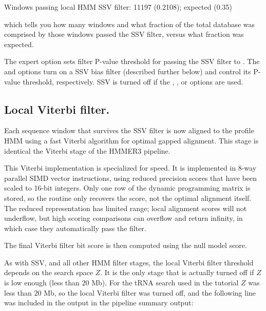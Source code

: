 \begin{sreoutput}
Windows   passing  local HMM SSV           filter:           11197  (0.2108); expected (0.35)
\end{sreoutput}

which tells you how many windows and what fraction of the total
database was comprised by those windows passed the 
SSV filter, versus what fraction was expected.

The  expert option sets filter P-value threshold for
passing the SSV filter to . The  and
 options turn on a SSV bias filter (described further
below) and control its P-value threshold, respectively. SSV is turned
off if the , , or  options
are used.

\subsection{Local Viterbi filter.}
Each sequence window that survives the SSV filter is now aligned to
the profile HMM using a fast Viterbi algorithm for optimal gapped
alignment. This stage is identical the Viterbi stage of the HMMER3
pipeline. 

This Viterbi implementation is specialized for speed.  It is
implemented in 8-way parallel SIMD vector instructions, using reduced
precision scores that have been scaled to 16-bit integers. Only one
row of the dynamic programming matrix is stored, so the routine only
recovers the score, not the optimal alignment itself. The reduced
representation has limited range; local alignment scores will not
underflow, but high scoring comparisons can overflow and return
infinity, in which case they automatically pass the filter.

The final Viterbi filter bit score is then computed using the null
model score. 

As with SSV, and all other HMM filter stages, the local Viterbi filter
threshold depends on the search space $Z$. It is the only stage that
is actually turned off if $Z$ is low enough (less than $20$ Mb). 
For the tRNA search used in the tutorial $Z$ was less than $20$ Mb, so
the local Viterbi filter was turned off, and the following line was
included in the output in the pipeline summary output:

